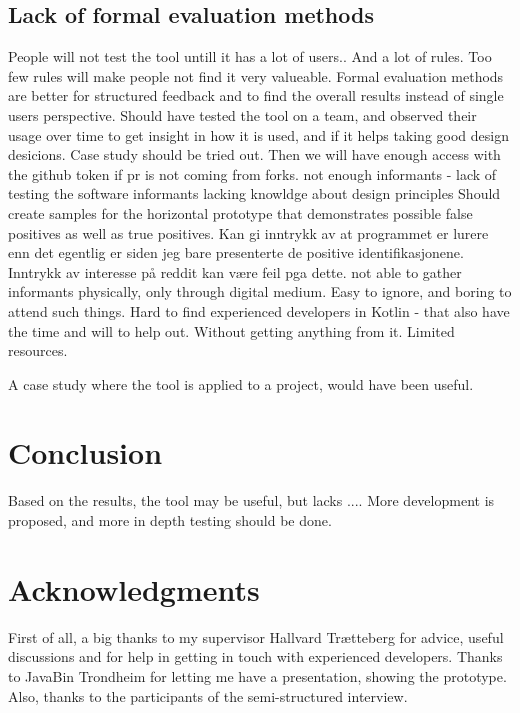 \documentclass{report}
\begin{document}
\subsection{Lack of formal evaluation methods}
People will not test the tool untill it has a lot of users.. And a lot of rules. Too few rules will make people not find it very valueable.
Formal evaluation methods are better for structured feedback and to find the overall results instead of single users perspective. 
Should have tested the tool on a team, and observed their usage over time to get insight in how it is used, and if it helps taking good design desicions. Case study should be tried out. Then we will have enough access with the github token if pr is not coming from forks. 
not enough informants - lack of testing the software
informants lacking knowldge about design principles
Should create samples for the horizontal prototype that demonstrates possible false positives as well as true positives. Kan gi inntrykk av at programmet er lurere enn det egentlig er siden jeg bare presenterte de positive identifikasjonene. Inntrykk av interesse på reddit kan være feil pga dette.
not able to gather informants physically, only through digital medium. Easy to ignore, and boring to attend such things. Hard to find experienced developers in Kotlin - that also have the time and will to help out. Without getting anything from it. Limited resources.


A case study where the tool is applied to a project, would have been useful.


\section{Conclusion}
\label{conclusion}
Based on the results, the tool may be useful, but lacks .... More development is proposed, and more in depth testing should be done.

\section{Acknowledgments}
\label{acknowledgements}
First of all, a big thanks to my supervisor Hallvard Trætteberg for advice, useful discussions and for help in getting in touch with experienced developers. Thanks to JavaBin Trondheim for letting me have a presentation, showing the prototype. Also, thanks to the participants of the semi-structured interview.

\printbibliography

\appendix
\label{appendix}

\end{document}
